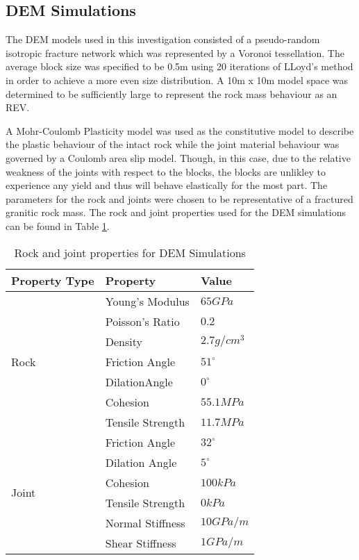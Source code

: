 \subsection{DEM Simulations}

The DEM models used in this investigation consisted of a pseudo-random isotropic fracture network which was represented by a Voronoi tessellation. The average block size was specified to be 0.5m using 20 iterations of LLoyd's method \cite{Lloyd_1982} in order to achieve a more even size distribution. A 10m x 10m model space was determined to be sufficiently large to represent the rock mass behaviour as an REV. 

A Mohr-Coulomb Plasticity model was used as the constitutive model to describe the plastic behaviour of the intact rock while the joint material behaviour was governed by a Coulomb area slip model. Though, in this case, due to the relative weakness of the joints with respect to the blocks, the blocks are unlikley to experience any yield and thus will behave elastically for the most part. The parameters for the rock and joints were chosen to be representative of a fractured granitic rock mass. The rock and joint properties used for the DEM simulations can be found in Table \ref{tab:demProp}.

\begin{table}[]
\centering
\caption{Rock and joint properties for DEM Simulations}
\label{tab:demProp}
\begin{tabular}{@{}lll@{}}
\toprule
Property Type          & Property         & Value        \\ \midrule
\multirow{7}{*}{Rock}  & Young's Modulus  & $65 GPa$     \\
                       & Poisson's Ratio  & $0.2$        \\
                       & Density          & $2.7 g/cm^3$ \\
                       & Friction Angle   & $51^{\circ}$ \\
                       & DilationAngle    & $0^{\circ}$  \\
                       & Cohesion         & $55.1 MPa$   \\
                       & Tensile Strength & $11.7 MPa$   \\ \cmidrule(r){1-1}
\multirow{6}{*}{Joint} & Friction Angle   & $32^{\circ}$ \\
                       & Dilation Angle   & $5^{\circ}$  \\
                       & Cohesion         & $100 kPa$    \\
                       & Tensile Strength & $0 kPa$      \\
                       & Normal Stiffness & $10 GPa/m$   \\
                       & Shear Stiffness  & $1 GPa/m$    \\ \bottomrule
\end{tabular}
\end{table}



